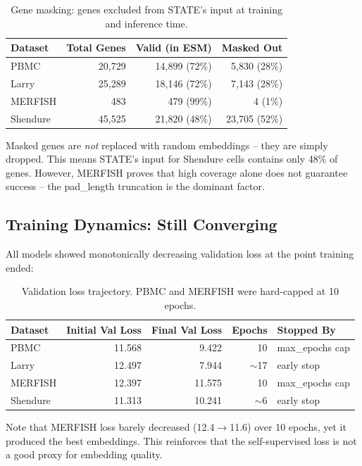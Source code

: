 \documentclass[11pt,a4paper]{article}
\begin{document}
\begin{table}[H]
\centering
\caption{Gene masking: genes excluded from STATE's input at training and inference time.}
\label{tab:gene_masking}
\begin{tabular}{lrrr}
\toprule
Dataset & Total Genes & Valid (in ESM) & Masked Out \\
\midrule
PBMC      & 20,729  & 14,899 (72\%)  & 5,830 (28\%) \\
Larry     & 25,289  & 18,146 (72\%)  & 7,143 (28\%) \\
MERFISH   & 483     & 479 (99\%)     & 4 (1\%) \\
Shendure  & 45,525  & 21,820 (48\%)  & 23,705 (52\%) \\
\bottomrule
\end{tabular}
\end{table}

\noindent Masked genes are \emph{not} replaced with random embeddings -- they are simply dropped. This means STATE's input for Shendure cells contains only 48\% of genes. However, MERFISH proves that high coverage alone does not guarantee success -- the pad\_length truncation is the dominant factor.

\subsection{Training Dynamics: Still Converging}

All models showed monotonically decreasing validation loss at the point training ended:

\begin{table}[H]
\centering
\caption{Validation loss trajectory. PBMC and MERFISH were hard-capped at 10 epochs.}
\label{tab:val_loss}
\begin{tabular}{lrrrl}
\toprule
Dataset & Initial Val Loss & Final Val Loss & Epochs & Stopped By \\
\midrule
PBMC      & 11.568 & 9.422  & 10 & max\_epochs cap \\
Larry     & 12.497 & 7.944  & $\sim$17 & early stop \\
MERFISH   & 12.397 & 11.575 & 10 & max\_epochs cap \\
Shendure  & 11.313 & 10.241 & $\sim$6  & early stop \\
\bottomrule
\end{tabular}
\end{table}

\noindent Note that MERFISH loss barely decreased (12.4$\to$11.6) over 10 epochs, yet it produced the best embeddings. This reinforces that the self-supervised loss is not a good proxy for embedding quality.
\end{document}
